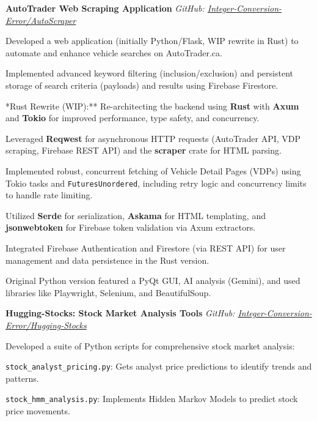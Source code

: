\documentclass[11pt]{article}
\begin{document}
\begin{small}
\noindent\textbf{AutoTrader Web Scraping Application} \hfill \textit{GitHub: \href{https://github.com/Integer-Conversion-Error/AutoScraper}{Integer-Conversion-Error/AutoScraper}}
\begin{compactitem}
    \item Developed a web application (initially Python/Flask, WIP rewrite in Rust) to automate and enhance vehicle searches on AutoTrader.ca.
    \item Implemented advanced keyword filtering (inclusion/exclusion) and persistent storage of search criteria (payloads) and results using Firebase Firestore.
    \item **Rust Rewrite (WIP):** Re-architecting the backend using \textbf{Rust} with \textbf{Axum} and \textbf{Tokio} for improved performance, type safety, and concurrency.
    \item Leveraged \textbf{Reqwest} for asynchronous HTTP requests (AutoTrader API, VDP scraping, Firebase REST API) and the \textbf{scraper} crate for HTML parsing.
    \item Implemented robust, concurrent fetching of Vehicle Detail Pages (VDPs) using Tokio tasks and \texttt{FuturesUnordered}, including retry logic and concurrency limits to handle rate limiting.
    \item Utilized \textbf{Serde} for serialization, \textbf{Askama} for HTML templating, and \textbf{jsonwebtoken} for Firebase token validation via Axum extractors.
    \item Integrated Firebase Authentication and Firestore (via REST API) for user management and data persistence in the Rust version.
    \item Original Python version featured a PyQt GUI, AI analysis (Gemini), and used libraries like Playwright, Selenium, and BeautifulSoup.
\end{compactitem}
\newpage
\noindent\textbf{Hugging-Stocks: Stock Market Analysis Tools} \hfill \textit{GitHub: \href{https://github.com/Integer-Conversion-Error/Hugging-Stocks}{Integer-Conversion-Error/Hugging-Stocks}}
\begin{compactitem}
    \item Developed a suite of Python scripts for comprehensive stock market analysis:
    \begin{compactitem}
        \item \texttt{stock\_analyst\_pricing.py}: Gets analyst price predictions to identify trends and patterns.
        \item \texttt{stock\_hmm\_analysis.py}: Implements Hidden Markov Models to predict stock price movements.

\end{compactitem}
\end{compactitem}
\end{small}
\end{document}
